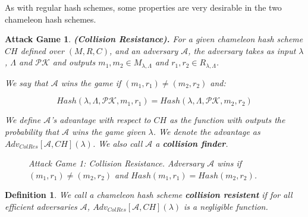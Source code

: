 \documentclass[a4paper]{article}
\newtheorem{definicao}{Definition}
\newtheorem{game}{Attack Game}
\begin{document}
 As with regular hash schemes, some properties are very desirable in 
 the two chameleon hash schemes.
 
 \begin{game}
 \textbf{(Collision Resistance).} For a given chameleon hash scheme $CH$ defined
 over $(M, R, C)$, and an adversary $\mathcal{A}$,
 the adversary takes as input $\lambda$, $\Lambda$ and $\mathcal{PK}$ and
 outputs $m_1, m_2 \in M_{\lambda,\Lambda}$ and
 $r_1, r_2 \in R_{\lambda,\Lambda}$.
 
 We say that $\mathcal{A}$ wins the game if $(m_1, r_1) \neq (m_2, r_2)$ and:
 
 $$
 Hash(\lambda, \Lambda, \mathcal{PK}, m_1, r_1)=
 Hash(\lambda,\Lambda,\mathcal{PK}, m_2, r_2)
 $$
 
 We define $\mathcal{A}$'s advantage with respect to $CH$ as the
 function with outputs the probability that $\mathcal{A}$ wins the game
 given $\lambda$. We denote the advantage as
 $Adv_{ColRes}[\mathcal{A},CH](\lambda)$. We also call $\mathcal{A}$ a
 \textbf{collision finder}.
 
 \begin{figure}
 \centering
 \caption{Attack Game 1: Collision Resistance. Adversary $\mathcal{A}$ wins if $(m_1, r_1)\neq(m_2, r_2)$ and $Hash(m_1, r_1)=Hash(m_2, r_2)$.}
 \end{figure}
 \end{game}
 
 \begin{definicao}
 We call a chameleon hash scheme \textbf{collision resistent} if for
 all efficient adversaries $\mathcal{A}$,
 $Adv_{ColRes}[\mathcal{A},CH](\lambda)$ is a negligible
 function.
 \end{definicao}
 
\end{document}
